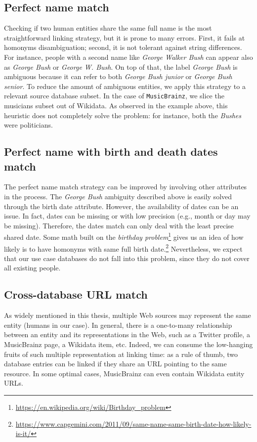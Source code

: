 \subsection{Perfect name match}
\label{cha:421}
Checking if two human entities share the same full name is the most straightforward linking strategy, but it is prone to many errors. First, it fails at homonyms disambiguation; second, it is not tolerant against string differences. For instance, people with a second name like \textit{George Walker Bush} can appear also as \textit{George Bush} or \textit{George W. Bush}. On top of that, the label \textit{George Bush} is ambiguous because it can refer to both \textit{George Bush junior} or \textit{George Bush senior}.
To reduce the amount of ambiguous entities, we apply this strategy to a relevant source database subset. In the case of \texttt{MusicBrainz}, we slice the musicians subset out of Wikidata. As observed in the example above, this heuristic does not completely solve the problem: for instance, both the \textit{Bushes} were politicians.

\subsection{Perfect name with birth and death dates match}
\label{cha:422}
The perfect name match strategy can be improved by involving other attributes in the process. The \textit{George Bush} ambiguity described above is easily solved through the birth date attribute. However, the availability of dates can be an issue. In fact, dates can be missing or with low precision (e.g., month or day may be missing). Therefore, the dates match can only deal with the least precise shared date.
Some math built on the \textit{birthday problem}\footnote{\url{https://en.wikipedia.org/wiki/Birthday_problem}} gives us an idea of how likely is to have homonyms with same full birth date.\footnote{\url{https://www.capgemini.com/2011/09/same-name-same-birth-date-how-likely-is-it/}}
Nevertheless, we expect that our use case databases do not fall into this problem, since they do not cover all existing people.

\subsection{Cross-database URL match}
\label{cha:423}
As widely mentioned in this thesis, multiple Web sources may represent the same entity (humans in our case). In general, there is a one-to-many relationship between an entity and its representations in the Web, such as a Twitter profile, a MusicBrainz page, a Wikidata item, etc.
Indeed, we can consume the low-hanging fruits of such multiple representation at linking time: as a rule of thumb, two database entries can be linked if they share an URL pointing to the same resource. In some optimal cases, MusicBrainz can even contain Wikidata entity URLs.

